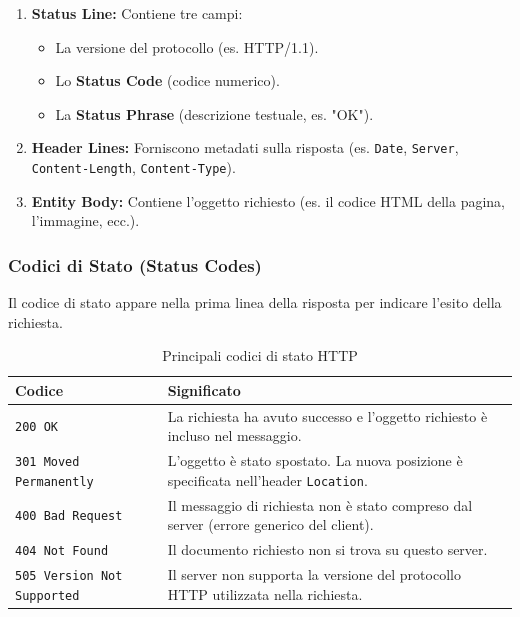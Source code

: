 \documentclass[a4paper,12pt]{report}
\begin{document}
\begin{enumerate}
    \item \textbf{Status Line:} Contiene tre campi:
    \begin{itemize}
        \item La versione del protocollo (es. HTTP/1.1).
        \item Lo \textbf{Status Code} (codice numerico).
        \item La \textbf{Status Phrase} (descrizione testuale, es. "OK").
    \end{itemize}
    
    \item \textbf{Header Lines:} Forniscono metadati sulla risposta (es. \texttt{Date}, \texttt{Server}, \texttt{Content-Length}, \texttt{Content-Type}).
    
    \item \textbf{Entity Body:} Contiene l'oggetto richiesto (es. il codice HTML della pagina, l'immagine, ecc.).
\end{enumerate}

\newpage
\subsubsection{Codici di Stato (Status Codes)}
Il codice di stato appare nella prima linea della risposta per indicare l'esito della richiesta.

\begin{table}[H]
\centering
\begin{tabularx}{\textwidth}{l X}
\toprule
\textbf{Codice} & \textbf{Significato} \\
\midrule
\texttt{200 OK} & La richiesta ha avuto successo e l'oggetto richiesto è incluso nel messaggio. \\
\midrule
\texttt{301 Moved Permanently} & L'oggetto è stato spostato. La nuova posizione è specificata nell'header \texttt{Location}. \\
\midrule
\texttt{400 Bad Request} & Il messaggio di richiesta non è stato compreso dal server (errore generico del client). \\
\midrule
\texttt{404 Not Found} & Il documento richiesto non si trova su questo server. \\
\midrule
\texttt{505 Version Not Supported} & Il server non supporta la versione del protocollo HTTP utilizzata nella richiesta. \\
\bottomrule
\end{tabularx}
\caption{Principali codici di stato HTTP}
\end{table}
\end{document}
